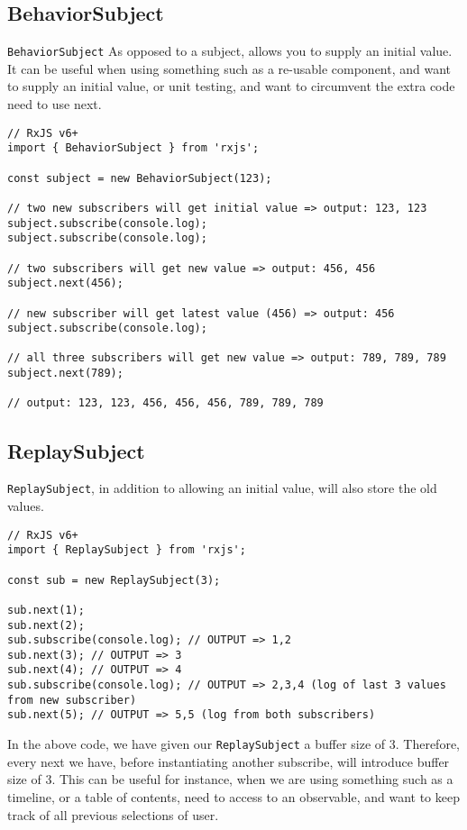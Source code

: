 \subsection{BehaviorSubject}
\lstinline{BehaviorSubject} As opposed to a subject, allows you to supply an 
initial value. It can be useful when using something such as a re-usable 
component, and want to supply an initial value, or unit testing, and want 
to circumvent the extra code need to use next. 
\begin{lstlisting}
// RxJS v6+
import { BehaviorSubject } from 'rxjs';

const subject = new BehaviorSubject(123);

// two new subscribers will get initial value => output: 123, 123
subject.subscribe(console.log);
subject.subscribe(console.log);

// two subscribers will get new value => output: 456, 456
subject.next(456);

// new subscriber will get latest value (456) => output: 456
subject.subscribe(console.log);

// all three subscribers will get new value => output: 789, 789, 789
subject.next(789);

// output: 123, 123, 456, 456, 456, 789, 789, 789  
\end{lstlisting}

\subsection{ReplaySubject}
\lstinline{ReplaySubject}, in addition to allowing an initial value, will also 
store the old values. 
\begin{lstlisting}
// RxJS v6+
import { ReplaySubject } from 'rxjs';

const sub = new ReplaySubject(3);

sub.next(1);
sub.next(2);
sub.subscribe(console.log); // OUTPUT => 1,2
sub.next(3); // OUTPUT => 3
sub.next(4); // OUTPUT => 4
sub.subscribe(console.log); // OUTPUT => 2,3,4 (log of last 3 values from new subscriber)
sub.next(5); // OUTPUT => 5,5 (log from both subscribers)  
\end{lstlisting}

In the above code, we have given our \lstinline{ReplaySubject} a buffer size of
3. Therefore, every next we have, before instantiating another subscribe, will 
introduce buffer size of 3. This can be useful for instance, when we are using something 
such as a timeline, or a table of contents, need to access to an observable, and want to 
keep track of all previous selections of user. 

